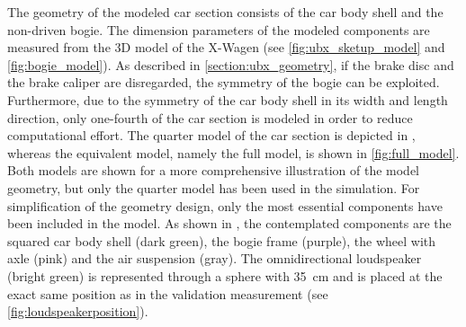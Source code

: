 The geometry of the modeled car section consists of the car body shell and the non-driven bogie. The dimension parameters of the modeled components are measured from the 3D model of the X-Wagen (see \cref{fig:ubx_sketup_model} and \cref{fig:bogie_model}).
As described in \cref{section:ubx_geometry}, if the brake disc and the brake caliper are disregarded, the symmetry of the bogie can be exploited. Furthermore, due to the symmetry of the car body shell in its width and length direction, only one-fourth of the car section is modeled in order to reduce computational effort. The quarter model of the car section is depicted in , whereas the equivalent model, namely the full model, is shown in \cref{fig:full_model}. Both models are shown for a more comprehensive illustration of the model geometry, but only the quarter model has been used in the simulation. For simplification of the geometry design, only the most essential components have been included in the model. As shown in , the contemplated components are the squared car body shell (dark green), the bogie frame (purple), the wheel with axle (pink) and the air suspension (gray). The omnidirectional loudspeaker (bright green) is represented through a sphere with \SI{35}{\centi\meter} and is placed at the exact same position as in the validation measurement (see \cref{fig:loudspeakerposition}). 

